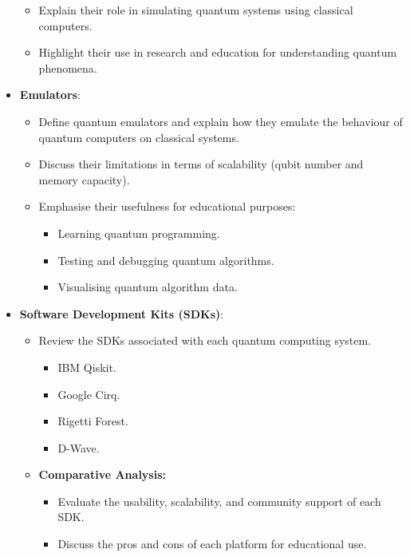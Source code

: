 \begin{itemize}
\begin{itemize}
            \item Explain their role in simulating quantum systems using classical computers. 
            \item Highlight their use in research and education for understanding quantum phenomena.
        \end{itemize}
    \item \textbf{Emulators}:
        \begin{itemize}
            \item Define quantum emulators and explain how they emulate the behaviour of quantum computers on classical systems.
            \item Discuss their limitations in terms of scalability (qubit number and memory capacity).
            \item Emphasise their usefulness for educational purposes:
                \begin{itemize}
                    \item Learning quantum programming.
                    \item Testing and debugging quantum algorithms. 
                    \item Visualising quantum algorithm data. 
                \end{itemize}
        \end{itemize}
    \item \textbf{Software Development Kits (SDKs)}:
        \begin{itemize}
            \item Review the SDKs associated with each quantum computing system. 
                \begin{itemize}
                    \item IBM Qiskit.
                    \item Google Cirq. 
                    \item Rigetti Forest.
                    \item D-Wave.
                \end{itemize}
            \item \textbf{Comparative Analysis:} 
                \begin{itemize}
                    \item Evaluate the usability, scalability, and community support of each SDK. 
                    \item Discuss the pros and cons of each platform for educational use. 
                \end{itemize}
        \end{itemize}
\end{itemize}

